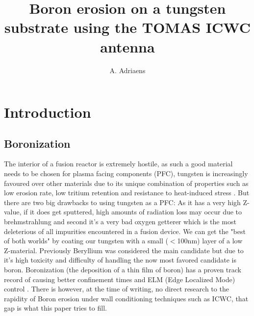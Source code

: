 \documentclass{article}
\title{Boron erosion on a tungsten substrate using the TOMAS ICWC antenna}
\author[1,2]{A. Adriaens}
\affil[1]{Laboratory for Plasma Physics LPP-ERM/KMS, Brussels, Belgium}
\affil[2]{Department of Applied Physics, Ghent University, Belgium}
\date{}
\begin{document}
\maketitle
\section{Introduction}
\subsection{Boronization}
The interior of a fusion reactor is extremely hostile, as such a good material
needs to be chosen for plasma facing components (PFC), tungsten is increasingly
favoured over other materials due to its unique combination of properties such
as low erosion rate, low tritium retention and resistance to heat-induced
stress \cite{PHILIPPS2011S2}\cite{Tungsten}.  But there are two big drawbacks to
using tungsten as a PFC: As it has a very high Z-value, if it does get
sputtered, high amounts of radiation loss may occur due to brehmstrahlung
\cite{JWinter_1996} and second it's a very bad oxygen getterer which is the most deleterious
of all impurities encountered in a fusion device. We can get the "best of both worlds" by
coating our tungsten with a small ($<$100nm) layer of a low Z-material.
Previously Beryllium was considered the main candidate but due to it's high
toxicity and difficulty of handling the now most favored candidate is boron.
Boronization (the deposition of a thin film of boron) has a proven track record
of causing better confinement times and ELM (Edge Localized Mode) control
\cite{ASDEXBoronisation}\cite{DIII-DBoronisation}\cite{EASTBoronisation}\cite{TEXTORBoronisation}.
There is however, at the time of writing, no direct research to the rapidity of
Boron erosion under wall conditioning techniques such as ICWC, that gap is what
this paper tries to fill.
\end{document}

